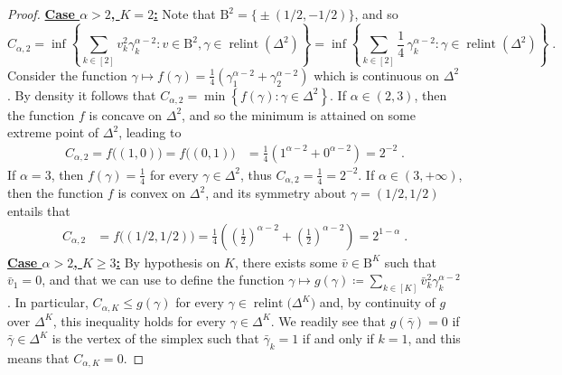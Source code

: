 \documentclass[11pt,oneside,a4paper]{article}
\newcommand{\lrb}[1]{\left(#1\right)}
\newcommand{\brb}[1]{\bigl(#1\bigr)}
\newcommand{\lcb}[1]{\left\{#1\right\}}
\newcommand{\bcb}[1]{\bigl\{#1\bigr\}}
\theoremstyle{plain}
\theoremstyle{definition}
\theoremstyle{remark}
\newcommand{\simplex}[1]{\Delta^{#1}}
\DeclareMathOperator*{\relint}{relint}
\newcommand{\tsphere}[1]{\mathrm{B}^{#1}}
\newcommand{\mycase}[1]{\underline{\textbf{Case #1:}}}
\begin{document}
{\begin{proof}
\mycase{$\alpha >2$, $K = 2$}
Note that $\tsphere{2} = \bcb{\pm (1/2, -1/2) }$, and so 
\[
    C_{\alpha, 2}
=
    \inf \lcb{\sum_{k \in [2]} v_k^2 \gamma_k^{\alpha -2} : v \in \tsphere{2}, \gamma \in \relint\lrb{\simplex{2}}}
=   
    \inf \lcb{\sum_{k \in [2]} \frac{1}{4}\, \gamma_k^{\alpha -2} : \gamma \in \relint\lrb{\simplex{2}}}\;.
\]
Consider the function $\gamma \mapsto f(\gamma) = \frac{1}{4}(\gamma_1^{\alpha - 2} + \gamma_2^{\alpha - 2})$
which is continuous on $\simplex{2}$. By density it follows that $C_{\alpha, 2} = \min \lcb{f(\gamma) : \gamma \in \simplex{2}}$.
If $\alpha \in (2,3)$, then the function $f$ is concave on $\simplex{2}$, and so the minimum is attained on some extreme point of $\simplex{2}$, leading to
\begin{align*}
        C_{\alpha , 2} = f\brb{(1,0)} = f\brb{(0,1)}
&=
        \frac{1}{4} (1^{\alpha - 2} + 0^{\alpha - 2})
=
        2^{-2}\;.
\end{align*}
If $\alpha = 3$, then  $f(\gamma)=\frac{1}{4}$ for every $\gamma \in \simplex{2}$, thus $C_{\alpha, 2} = \frac{1}{4}=2^{-2}$. 
If $\alpha \in (3,+\infty)$, then the function $f$ is convex on $\simplex{2}$, and its symmetry about $\gamma = (1/2, 1/2)$ entails that 
\begin{align*}
    C_{\alpha , 2}
&=
    f\brb{(1/2, 1/2)}
=
        \frac{1}{4} \lrb{ \lrb{\frac{1}{2}}^{\alpha - 2} + \lrb{\frac{1}{2}}^{\alpha - 2}}
=
        2^{1 - \alpha}\;.
\end{align*}
\mycase{$\alpha >2$, $K \geq 3$}
By hypothesis on $K$, there exists some $\bar{v} \in \tsphere{K}$ such that $\bar{v}_1 = 0$, and that we can use to define the function $\gamma \mapsto g(\gamma) \coloneq \sum_{k \in [K]} \bar{v}_k^2 \gamma_k^{\alpha -2}$.
In particular,
$ C_{\alpha, K} \le g(\gamma)$
for every $\gamma \in \relint{\brb{\simplex{K}}}$ and, by continuity of $g$ over $\simplex{K}$, this inequality holds for every $\gamma \in \simplex{K}$.
We readily see that $g(\bar{\gamma}) = 0$ if $\bar{\gamma} \in \simplex{K}$
is the vertex of the simplex such that 
$\bar{\gamma}_k = 1$ if and only if $k = 1$, and 
this means that $C_{\alpha, K} = 0$.
\end{proof}
}
\end{document}
